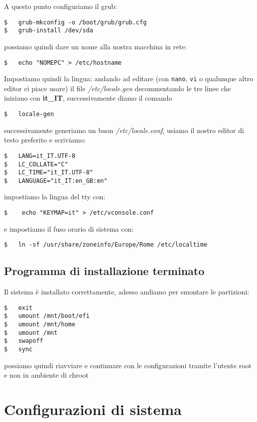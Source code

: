 \documentclass[twoside,italian]{book}
\newcommand{\code}[1]{\texttt{#1}}
\begin{document}
    A questo punto configuriamo il grub: 
    \begin{lstlisting}
$   grub-mkconfig -o /boot/grub/grub.cfg 
$   grub-install /dev/sda
    \end{lstlisting}

    possiamo quindi dare un nome alla nostra macchina in rete:
    \begin{lstlisting}
$   echo "NOMEPC" > /etc/hostname
    \end{lstlisting}

    Impostiamo quindi la lingua: andando ad editare (con \code{nano}, \code{vi} o qualunque altro editor ci piace usare) il file \textit{/etc/locale.gen} decommentando le tre linee che iniziano con \textbf{it\_IT}, successivamente diamo il comando 
    \begin{lstlisting}
$   locale-gen
    \end{lstlisting}

    successivamente generiamo un buon \textit{/etc/locale.conf}, usiamo il nostro editor di testo preferito e scriviamo:

\begin{lstlisting}
$   LANG=it_IT.UTF-8
$   LC_COLLATE="C"
$   LC_TIME="it_IT.UTF-8"
$   LANGUAGE="it_IT:en_GB:en"
\end{lstlisting}

    impostiamo la lingua del tty con:
\begin{lstlisting}
$    echo "KEYMAP=it" > /etc/vconsole.conf
\end{lstlisting}
    e impostiamo il fuso orario di sistema con:
\begin{lstlisting}
$   ln -sf /usr/share/zoneinfo/Europe/Rome /etc/localtime
\end{lstlisting}

\section {Programma di installazione terminato}

    Il sistema è installato correttamente, adesso andiamo per smontare le partizioni:
\begin{lstlisting}
$   exit
$   umount /mnt/boot/efi
$   umount /mnt/home
$   umount /mnt
$   swapoff
$   sync
\end{lstlisting}

    possiamo quindi riavviare e continuare con le configurazioni tramite l'utente root e non in ambiente di chroot

\cleardoublepage
\chapter{Configurazioni di sistema}
\end{document}
